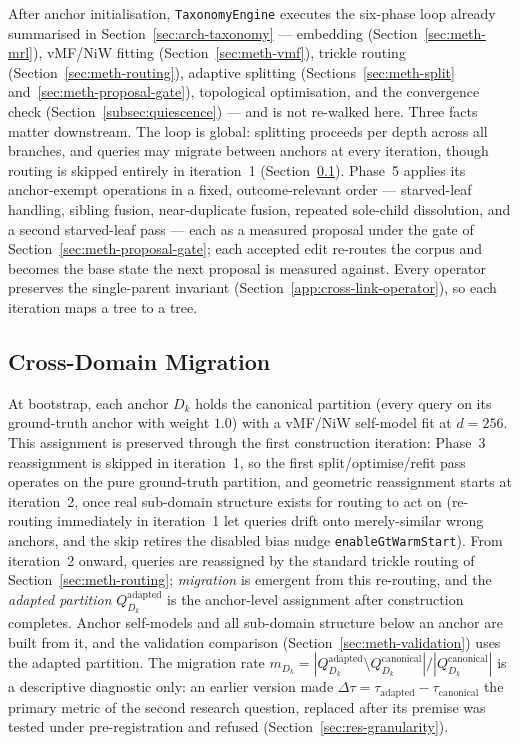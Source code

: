 After anchor initialisation, \texttt{TaxonomyEngine} executes the six-phase loop already
summarised in Section~\ref{sec:arch-taxonomy} --- embedding
(Section~\ref{sec:meth-mrl}), vMF/NiW fitting (Section~\ref{sec:meth-vmf}), trickle
routing (Section~\ref{sec:meth-routing}), adaptive splitting
(Sections~\ref{sec:meth-split} and~\ref{sec:meth-proposal-gate}), topological
optimisation, and the convergence check (Section~\ref{subsec:quiescence}) --- and is not
re-walked here. Three facts matter downstream.
The loop is global: splitting proceeds per depth across all branches, and queries may
migrate between anchors at every iteration, though routing is skipped entirely in
iteration~1 (Section~\ref{subsec:migration}).
Phase~5 applies its anchor-exempt operations in a fixed, outcome-relevant order ---
starved-leaf handling, sibling fusion, near-duplicate fusion, repeated sole-child
dissolution, and a second starved-leaf pass --- each as a measured proposal under the
gate of Section~\ref{sec:meth-proposal-gate}; each accepted edit re-routes the corpus
and becomes the base state the next proposal is measured against.
Every operator preserves the single-parent invariant
(Section~\ref{app:cross-link-operator}), so each iteration maps a tree to a tree.

\subsection{Cross-Domain Migration}\label{subsec:migration}\label{sec:meth-migration}

At bootstrap, each anchor $D_k$ holds the canonical partition (every query on its
ground-truth anchor with weight $1.0$) with a vMF/NiW self-model fit at $d = 256$.
This assignment is preserved through the first construction iteration: Phase~3
reassignment is skipped in iteration~1, so the first split/optimise/refit pass operates
on the pure ground-truth partition, and geometric reassignment starts at iteration~2,
once real sub-domain structure exists for routing to act on (re-routing immediately in
iteration~1 let queries drift onto merely-similar wrong anchors, and the skip retires the
disabled bias nudge \texttt{enableGtWarmStart}).
From iteration~2 onward, queries are reassigned by the standard trickle routing of
Section~\ref{sec:meth-routing}; \textit{migration} is emergent from this re-routing, and
the \textit{adapted partition} $Q_{D_k}^{\text{adapted}}$ is the anchor-level assignment
after construction completes. Anchor self-models and all sub-domain structure below an
anchor are built from it, and the validation comparison
(Section~\ref{sec:meth-validation}) uses the adapted partition.
The migration rate
$m_{D_k} = |Q_{D_k}^{\text{adapted}} \setminus Q_{D_k}^{\text{canonical}}| /
|Q_{D_k}^{\text{canonical}}|$ is a descriptive diagnostic only: an earlier version made
$\Delta\tau = \tau_{\text{adapted}} - \tau_{\text{canonical}}$ the primary metric of the
second research question, replaced after its premise was tested under pre-registration
and refused (Section~\ref{sec:res-granularity}).

